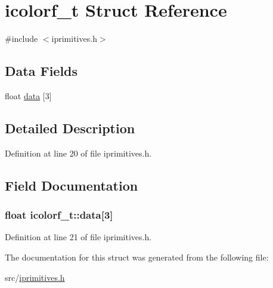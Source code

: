 \hypertarget{structicolorf__t}{\section{icolorf\-\_\-t Struct Reference}
\label{structicolorf__t}
}


{\ttfamily \#include $<$iprimitives.\-h$>$}

\subsection*{Data Fields}
\begin{DoxyCompactItemize}
\item 
float \hyperlink{structicolorf__t_a4b38a1a5c2c96286fd18691bae9fc053}{data} \mbox{[}3\mbox{]}
\end{DoxyCompactItemize}


\subsection{Detailed Description}


Definition at line 20 of file iprimitives.\-h.



\subsection{Field Documentation}
\hypertarget{structicolorf__t_a4b38a1a5c2c96286fd18691bae9fc053}{
\subsubsection[{data}]{\setlength{\rightskip}{0pt plus 5cm}float icolorf\-\_\-t\-::data\mbox{[}3\mbox{]}}}\label{structicolorf__t_a4b38a1a5c2c96286fd18691bae9fc053}


Definition at line 21 of file iprimitives.\-h.



The documentation for this struct was generated from the following file\-:\begin{DoxyCompactItemize}
\item 
src/\hyperlink{iprimitives_8h}{iprimitives.\-h}\end{DoxyCompactItemize}
